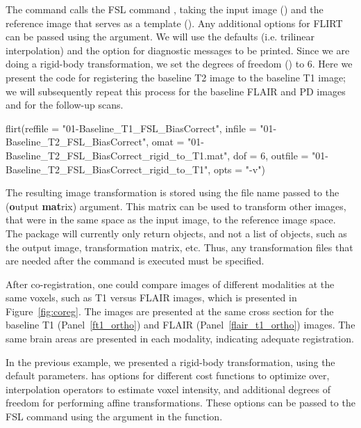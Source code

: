 The  command  calls the FSL command , taking the input image () and the reference image that serves as a template ().  Any additional options for FLIRT can be passed using the  argument.  We will use the defaults (i.e. trilinear interpolation) and the  option for diagnostic messages to be printed.  Since we are doing a rigid-body transformation, we set the degrees of freedom () to 6. Here we present the code for registering the baseline T2 image to the baseline T1 image; we will subsequently repeat this process for the baseline FLAIR and PD images and for the follow-up scans. 
\begin{Schunk}
\begin{Sinput}
flirt(reffile = "01-Baseline_T1_FSL_BiasCorrect",  
      infile = "01-Baseline_T2_FSL_BiasCorrect", 
      omat = "01-Baseline_T2_FSL_BiasCorrect_rigid_to_T1.mat", 
      dof = 6, 
      outfile = "01-Baseline_T2_FSL_BiasCorrect_rigid_to_T1", 
      opts = "-v")
\end{Sinput}
\end{Schunk}



The resulting image transformation is stored using the file name passed to the  ({\bf o}utput {\bf mat}rix) argument.  This matrix can be used to transform other images, that were in the same space as the input image, to the reference image space.  The  package will currently only return  objects, and not a list of objects, such as the output image, transformation matrix, etc.  Thus, any transformation files that are needed after the command is executed must be specified.  

After co-registration, one could compare images of different modalities at the same voxels, such as T1 versus FLAIR images, which is presented in Figure~\ref{fig:coreg}.  The images are presented at the same cross section for the baseline T1 (Panel~\ref{ft1_ortho}) and FLAIR (Panel~\ref{flair_t1_ortho}) images.  The same brain areas are presented in each modality, indicating adequate registration.  


In the previous example, we presented a rigid-body transformation, using the default parameters.   has options for different cost functions to optimize over, interpolation operators to estimate voxel intensity, and additional degrees of freedom for performing affine transformations.  These options can be passed to the FSL  command using the  argument in the   function.  

